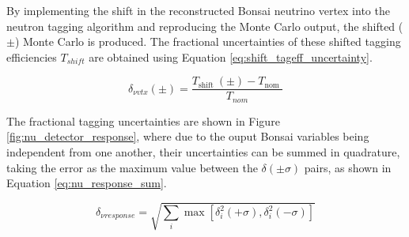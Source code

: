 By implementing the shift in the reconstructed Bonsai neutrino vertex into the neutron tagging algorithm and reproducing the Monte Carlo output, the shifted ($\pm$) Monte Carlo is produced. The fractional uncertainties of these shifted tagging efficiencies $T_{shift}$ are obtained using Equation \ref{eq:shift_tageff_uncertainty}.

\begin{equation}
    \delta_{\nu v t x}(\pm)=\frac{T_{\text {shift }}(\pm)-T_{\text {nom }}}{T_{n o m}}
    \label{eq:shift_tageff_uncertainty}
\end{equation}

The fractional tagging uncertainties are shown in Figure \ref{fig:nu_detector_response}, where due to the ouput Bonsai variables being independent from one another, their uncertainties can be summed in quadrature, taking the error as the maximum value between the $\delta(\pm\sigma)$ pairs, as shown in Equation \ref{eq:nu_response_sum}.

\begin{equation}
    \delta_{\nu r e s p o n s e}=\sqrt{\sum_i \max \left[\delta_i^2(+\sigma), \delta_i^2(-\sigma)\right]}
\label{eq:nu_response_sum}
\end{equation}


